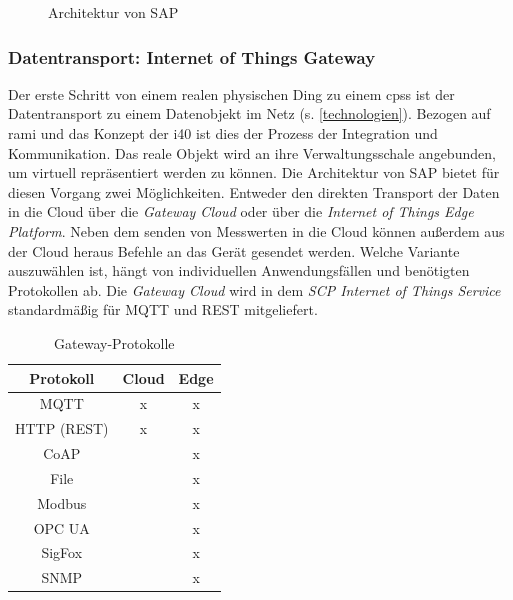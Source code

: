\begin{figure}[ht!]
  \centering
  \noindent{}
  \caption[Architektur von SAP]{Architektur von SAP \citep{Ganz2019}}
  \label{saparch}
\end{figure}

\newpage
\subsubsection{Datentransport: Internet of Things Gateway}



  Der erste Schritt von einem realen physischen Ding zu einem \ac{cpss} ist der Datentransport zu einem Datenobjekt im Netz (s. \ref{technologien}). Bezogen auf \ac{rami} und das Konzept der \acf{i40} ist dies der Prozess der Integration und Kommunikation. Das reale Objekt wird an ihre Verwaltungsschale angebunden, um virtuell repräsentiert werden zu können. Die Architektur von SAP bietet für diesen Vorgang zwei Möglichkeiten. Entweder den direkten Transport der Daten in die Cloud über die \textit{Gateway Cloud} oder über die \textit{Internet of Things Edge Platform}. Neben dem senden von Messwerten in die Cloud können außerdem aus der Cloud heraus Befehle an das Gerät gesendet werden. Welche Variante auszuwählen ist, hängt von individuellen Anwendungsfällen und benötigten Protokollen ab. Die \textit{Gateway Cloud} wird in dem \textit{SCP Internet of Things Service} standardmäßig für MQTT und REST mitgeliefert.
  \begin{table}
    \caption{Gateway-Protokolle}\label{gateway}
    \begin{tabular}{ccc}\\\toprule
    Protokoll & Cloud & Edge \\\midrule
    MQTT &x & x\\  \midrule
    HTTP (REST) & x & x\\  \midrule
    CoAP& & x\\  \midrule
    File &  & x\\  \midrule
    Modbus & & x\\  \midrule
    OPC UA & & x\\  \midrule
    SigFox & & x\\  \midrule
    SNMP & & x\\  \bottomrule
    \end{tabular}
    \label{protocol}
  \end{table}
  \newline
